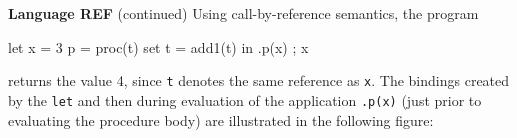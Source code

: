 \begin{minipage}[t]{\sw}
\slidenumber
\LARGE
{\bf Language REF} (continued)\exx
Using call-by-reference semantics,
the program
\begin{qv}
let
  x = 3
  p = proc(t) set t = add1(t)
in
  { .p(x) ; x }
\end{qv}
returns the value 4, since \verb't' denotes
the same reference as \verb'x'.
The bindings created by the \verb'let'
and then during evaluation of the application \verb'.p(x)'
(just prior to evaluating the procedure body)
are illustrated in the following figure:
\end{minipage}
\clearpage

